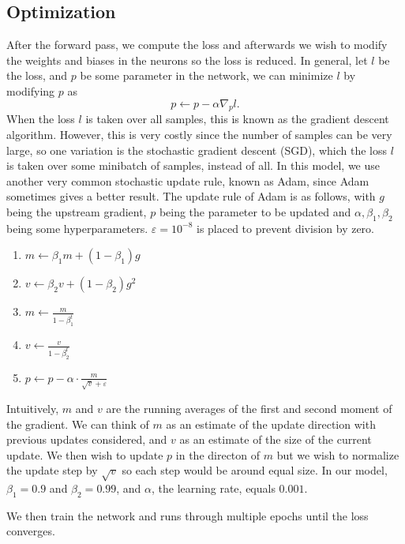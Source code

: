 \documentclass[12pt]{article}
\theoremstyle{remark}
\begin{document}
\subsection{Optimization}
After the forward pass, we compute the loss and afterwards we wish to modify the weights and biases in the neurons so the loss is reduced. In general, let \(l\) be the loss, and \(p\) be some parameter in the network, we can minimize \(l\) by modifying \(p\) as
\[
	p \leftarrow p - \alpha \nabla_p l.
\]
When the loss \(l\) is taken over all samples, this is known as the gradient descent algorithm. However, this is very costly since the number of samples can be very large, so one variation is the stochastic gradient descent (SGD), which the loss \(l\) is taken over some minibatch of samples, instead of all.
In this model, we use another very common stochastic update rule, known as Adam, since Adam sometimes gives a better result. The update rule of Adam is as follows, with \(g\) being the upstream gradient, \(p\) being the parameter to be updated and \(\alpha, \beta_1, \beta_2\) being some hyperparameters. \(\varepsilon = 10^{-8}\) is placed to prevent division by zero.
\begin{enumerate}
	\item \(m \leftarrow \beta_1  m + (1 - \beta_1)  g\)
	\item \(v \leftarrow \beta_2  v + (1 - \beta_2)  g^2\)
	\item \(\displaystyle m \leftarrow \frac{m}{1 - \beta_1^t}\)
	\item \(\displaystyle v \leftarrow \frac{v}{1 - \beta_2^t}\)
	\item \(\displaystyle p \leftarrow p - \alpha \cdot \frac{m}{\sqrt{v} + \varepsilon}\)
\end{enumerate}
Intuitively, \(m\) and \(v\) are the running averages of the first and second moment of the gradient. We can think of \(m\) as an estimate of the update direction with previous updates considered, and \(v\) as an estimate of the size of the current update. We then wish to update \(p\) in the directon of \(m\) but we wish to normalize the update step by \(\sqrt{v}\) so each step would be around equal size. In our model, \(\beta_1=0.9\) and \(\beta_2=0.99\), and \(\alpha\), the learning rate, equals \(0.001\).

We then train the network and runs through multiple epochs until the loss converges.
\end{document}
